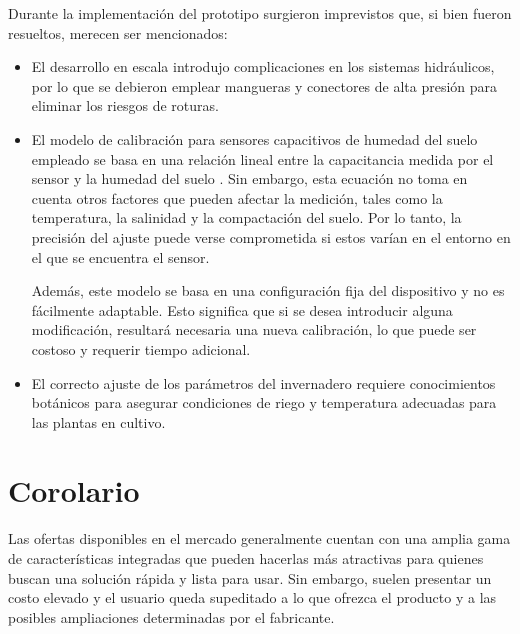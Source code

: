 Durante la implementación del prototipo surgieron imprevistos que, si bien fueron resueltos, merecen ser mencionados:
\begin{itemize}
\item El desarrollo en escala introdujo complicaciones en los sistemas hidráulicos, por lo que se debieron emplear mangueras y conectores de alta presión para eliminar los riesgos de roturas.

\item El modelo de calibración para sensores capacitivos de humedad del suelo empleado se basa en una relación lineal entre la capacitancia medida por el sensor y la humedad del suelo \citep{soilcalibration}. Sin embargo, esta ecuación no toma en cuenta otros factores que pueden afectar la medición, tales como la temperatura, la salinidad y la compactación del suelo. Por lo tanto, la precisión del ajuste puede verse comprometida si estos varían en el entorno en el que se encuentra el sensor.

Además, este modelo se basa en una configuración fija del dispositivo y no es fácilmente adaptable. Esto significa que si se desea introducir alguna modificación, resultará necesaria una nueva calibración, lo que puede ser costoso y requerir tiempo adicional.

\item El correcto ajuste de los parámetros del invernadero requiere conocimientos botánicos para asegurar condiciones de riego y temperatura adecuadas para las plantas en cultivo. 
\end{itemize}


\section{Corolario}
Las ofertas disponibles en el mercado generalmente cuentan con una amplia gama de características integradas que pueden hacerlas más atractivas para quienes buscan una solución rápida y lista para usar. Sin embargo, suelen presentar un costo elevado y el usuario queda supeditado a lo que ofrezca el producto y a las posibles ampliaciones determinadas por el fabricante.


